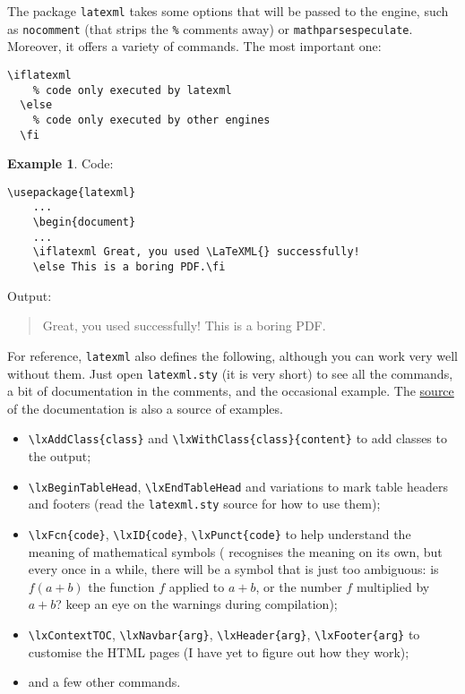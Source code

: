 \documentclass[a4paper]{article}
\def\ltxinline{\lstinline[style=latexml,frame=none]}
\theoremstyle{definition}
\newtheorem{exa}{Example}[subsection]
\begin{document}
The package \verb|latexml| takes some options that will be passed to the \LaTeXML{} engine, such as \ltxinline|nocomment| (that strips the \ltxinline|%
\begin{lstlisting}[style=latexml]
  \iflatexml
    % code only executed by latexml
  \else
    % code only executed by other engines
  \fi
\end{lstlisting}

\begin{exa}
  Code:
  \begin{lstlisting}[style=latexml]
    \usepackage{latexml}
    ...
    \begin{document}
    ...
    \iflatexml Great, you used \LaTeXML{} successfully!
    \else This is a boring PDF.\fi
  \end{lstlisting}
  Output:
  \begin{quote}
    \iflatexml Great, you used \LaTeXML{} successfully!
    \else This is a boring PDF.\fi
  \end{quote}
\end{exa}

For reference, \verb|latexml| also defines the following, although you can work very well without them. Just open \verb|latexml.sty| (it is very short) to see all the commands, a bit of documentation in the comments, and the occasional example. The \href{https://github.com/brucemiller/LaTeXML/tree/master/doc/manual}{source} of the \LaTeXML{} documentation is also a source of examples.
\begin{itemize}
  \item \ltxinline|\lxAddClass{class}| and \ltxinline|\lxWithClass{class}{content}| to add \CSS{} classes to the output;
  \item \ltxinline|\lxBeginTableHead|, \ltxinline|\lxEndTableHead| and variations to mark table headers and footers (read the \verb|latexml.sty| source for how to use them);
  \item \ltxinline|\lxFcn{code}|, \ltxinline|\lxID{code}|, \ltxinline|\lxPunct{code}| to help \LaTeXML{} understand the meaning of mathematical symbols (\LaTeXML{} recognises the meaning on its own, but every once in a while, there will be a symbol that is just too ambiguous: is $f(a+b)$ the function $f$ applied to $a+b$, or the number $f$ multiplied by $a+b$? keep an eye on the warnings during compilation);
  \item \ltxinline|\lxContextTOC|, \ltxinline|\lxNavbar{arg}|, \ltxinline|\lxHeader{arg}|, \ltxinline|\lxFooter{arg}| to customise the HTML pages (I have yet to figure out how they work);
  \item and a few other commands.
\end{itemize}
\end{document}
